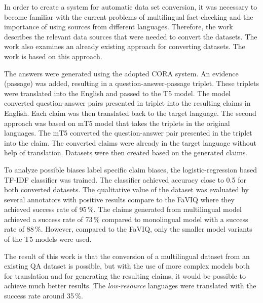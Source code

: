 In order to create a system for automatic data set conversion, it was necessary to become familiar with the current problems of multilingual fact-checking and the importance of using sources from different languages. Therefore, the work describes the relevant data sources that were needed to convert the datasets. The work also examines an already existing approach for converting datasets. The work is based on this approach.

The answers were generated using the adopted CORA system. An evidence (passage) was added, resulting in a question-answer-passage triplet. These triplets were translated into the English and passed to the T5 model. The model converted question-answer pairs presented in triplet into the resulting claims in English. Each claim was then translated back to the target language. The second approach was based on mT5 model that takes the triplets in the original languages. The mT5 converted the question-answer pair presented in the triplet into the claim. The converted claims were already in the target language without help of translation. Datasets were then created based on the generated claims.

To analyze possible biases label specific claim biases, the logistic-regression based TF-IDF classifier was trained. The classifier achieved accuracy close to  0.5 for both converted datasets. The qualitative value of the dataset was evaluated by several annotators with positive results compare to the FaVIQ where they achieved success rate of 95\,\%. The claims generated from multilingual model achieved a success rate of 73\,\% compared to monolingual model with a success rate of 88\,\%. However, compared to the FaVIQ, only the smaller model variants of the T5 models were used. 

The result of this work is that the conversion of a multilingual dataset from an existing QA dataset is possible, but with the use of more complex models both for translation and for generating the resulting claims, it would be possible to achieve much better results. The \emph{low-resource} languages were translated with the success rate around 35\,\%.